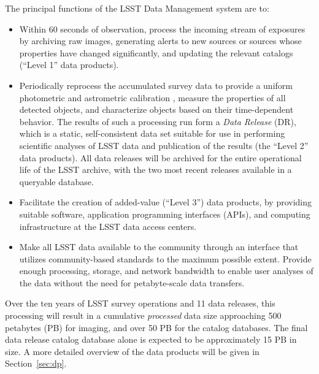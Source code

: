 \documentclass[11pt,twoside]{article}
\begin{document}
The principal functions of the LSST Data Management system \citep{lsstSRD} are to:
\begin{itemize}
\item Within 60 seconds of observation, process the incoming stream of exposures by archiving raw images, generating alerts to new sources or sources whose properties have changed significantly, and updating the relevant catalogs (``Level 1'' data products).
\item Periodically reprocess the accumulated survey data to provide a
  uniform photometric and astrometric calibration \citep[e.g.,][]{LSE-180}, measure the
  properties of all detected objects, and characterize objects based on their time-dependent behavior. The results of such a processing run form a {\em Data Release} (DR), which is a static, self-consistent data set suitable for use in performing scientific analyses of LSST data and publication of the results (the ``Level 2'' data products). All data releases will be archived for the entire operational life of the LSST
archive, with the two most recent releases available in a
queryable database.
\item Facilitate the creation of added-value (``Level 3'') data products, by providing suitable software,
  application programming interfaces (APIs),
and computing infrastructure at the LSST data access centers.
\item Make all LSST data available to the community through an interface that utilizes
community-based standards   to the maximum possible extent. Provide
  enough processing, storage, and network bandwidth to enable user
  analyses of the data without the need for petabyte-scale data
  transfers.
\end{itemize}

Over the ten years of LSST survey operations and 11 data releases, this processing will result in a cumulative {\em processed} data size
approaching 500 petabytes (PB) for imaging, and over 50 PB for the
catalog databases. The final data release catalog database alone is expected
to be approximately 15 PB in size. A more detailed overview of the data products will be given in
Section~\ref{sec:dp}.
\\
\end{document}
